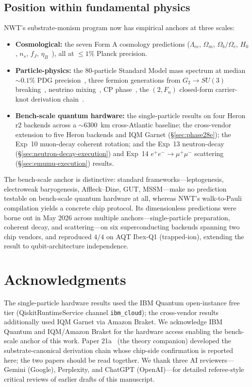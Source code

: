 \documentclass[11pt]{article}
\begin{document}
\subsection{Position within fundamental physics}
\label{sec:position}

NWT's substrate-monism program now has empirical anchors at three scales:
\begin{itemize}
\item \textbf{Cosmological:} the seven Form A cosmology predictions ($\Lambda_\text{cc}$, $\Omega_m$, $\Omega_b / \Omega_c$, $H_0$, $n_s$, $f_J$, $\eta_B$~\cite{Paper25Memo}), all at $\leq 1\%$ Planck precision.
\item \textbf{Particle-physics:} the $80$-particle Standard Model mass spectrum at median $\sim 0.1\%$ PDG precision~\cite{Paper13}, three fermion generations from $G_2 \to SU(3)$ breaking~\cite{Paper20}, neutrino mixing~\cite{Paper20}, CP phase~\cite{Paper13,Paper20}, the $(2, F_n)$ closed-form carrier-knot derivation chain~\cite{Paper21a}.
\item \textbf{Bench-scale quantum hardware:} the single-particle results on four Heron r2 backends across a $\sim 6300$~km cross-Atlantic baseline; the cross-vendor extension to five Heron backends and IQM Garnet (\S\ref{sec:phase28e}); the Exp~10 muon-decay coherent rotation; and the Exp~13 neutron-decay (\S\ref{sec:neutron-decay-execution}) and Exp~14 $e^+ e^- \to \mu^+ \mu^-$ scattering (\S\ref{sec:emumu-execution}) results.
\end{itemize}

The bench-scale anchor is distinctive: standard frameworks---leptogenesis, electroweak baryogenesis, Affleck--Dine, GUT, MSSM---make no prediction testable on bench-scale quantum hardware at all, whereas NWT's walk-to-Pauli compilation yields a concrete chip protocol.  Its dimensionless predictions were borne out in May 2026 across multiple anchors---single-particle preparation, coherent decay, and scattering---on six superconducting backends spanning two chip vendors, and reproduced $4/4$ on AQT Ibex-Q1 (trapped-ion), extending the result to qubit-architecture independence.

\section*{Acknowledgments}

The single-particle hardware results used the IBM Quantum open-instance free tier (QiskitRuntimeService channel \texttt{ibm\_cloud}); the cross-vendor results additionally used IQM Garnet via Amazon Braket.  We acknowledge IBM Quantum and IQM/Amazon Braket for the hardware access enabling the bench-scale anchor of this work.  Paper 21a~\cite{Paper21a} (the theory companion) developed the substrate-canonical derivation chain whose chip-side confirmation is reported here; the two papers should be read together.  We thank three AI reviewers---Gemini (Google), Perplexity, and ChatGPT (OpenAI)---for detailed referee-style critical reviews of earlier drafts of this manuscript.
\end{document}
